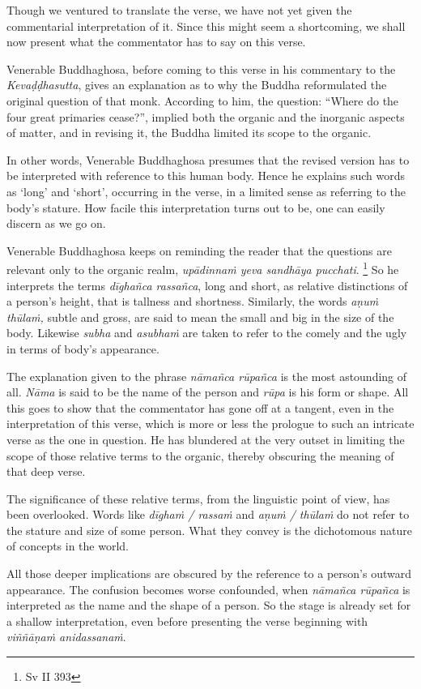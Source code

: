 Though we ventured to translate the verse, we have not yet given the commentarial interpretation of it. Since this might seem a shortcoming, we shall now present what the commentator has to say on this verse.

Venerable Buddhaghosa, before coming to this verse in his commentary to the \emph{Kevaḍḍhasutta}, gives an explanation as to why the Buddha reformulated the original question of that monk. According to him, the question: ``Where do the four great primaries cease?'', implied both the organic and the inorganic aspects of matter, and in revising it, the Buddha limited its scope to the organic.

In other words, Venerable Buddhaghosa presumes that the revised version has to be interpreted with reference to this human body. Hence he explains such words as `long' and `short', occurring in the verse, in a limited sense as referring to the body's stature. How facile this interpretation turns out to be, one can easily discern as we go on.

Venerable Buddhaghosa keeps on reminding the reader that the questions are relevant only to the organic realm, \emph{upādinnaṁ yeva sandhāya pucchati}. \footnote{Sv II 393} So he interprets the terms \emph{dīghañca rassañca}, long and short, as relative distinctions of a person's height, that is tallness and shortness. Similarly, the words \emph{aṇuṁ thūlaṁ,} subtle and gross, are said to mean the small and big in the size of the body. Likewise \emph{subha} and \emph{asubhaṁ} are taken to refer to the comely and the ugly in terms of body's appearance.

The explanation given to the phrase \emph{nāmañca rūpañca} is the most astounding of all. \emph{Nāma} is said to be the name of the person and \emph{rūpa} is his form or shape. All this goes to show that the commentator has gone off at a tangent, even in the interpretation of this verse, which is more or less the prologue to such an intricate verse as the one in question. He has blundered at the very outset in limiting the scope of those relative terms to the organic, thereby obscuring the meaning of that deep verse.

The significance of these relative terms, from the linguistic point of view, has been overlooked. Words like \emph{dīghaṁ / rassaṁ} and \emph{aṇuṁ / thūlaṁ} do not refer to the stature and size of some person. What they convey is the dichotomous nature of concepts in the world.

All those deeper implications are obscured by the reference to a person's outward appearance. The confusion becomes worse confounded, when \emph{nāmañca rūpañca} is interpreted as the name and the shape of a person. So the stage is already set for a shallow interpretation, even before presenting the verse beginning with \emph{viññāṇaṁ anidassanaṁ}.

